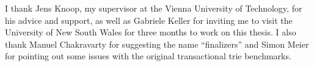 \begin{acknowledgements*}

I thank Jens Knoop, my supervisor at the Vienna University of Technology, for his advice and support, as well as Gabriele Keller for inviting me to visit the University of New South Wales for three months to work on this thesis. I also thank Manuel Chakravarty for suggesting the name ``finalizers'' and Simon Meier for pointing out some issues with the original transactional trie benchmarks.

\end{acknowledgements*}
